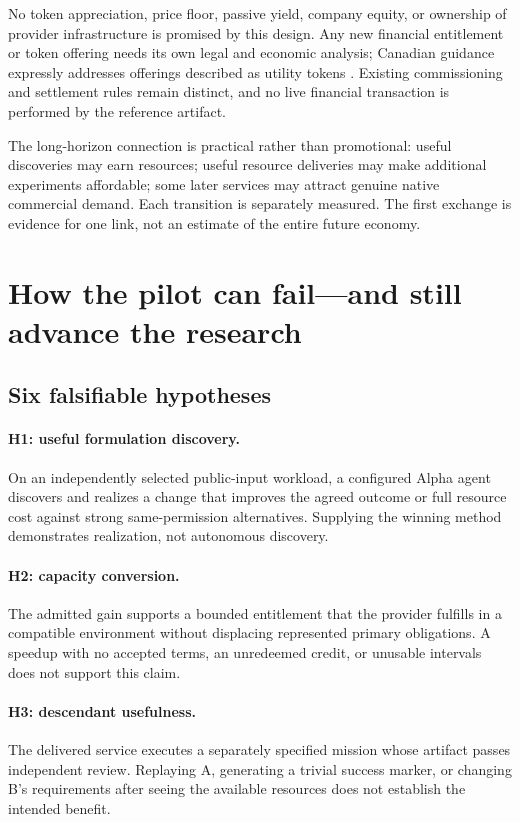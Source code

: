 \documentclass[11pt,letterpaper]{article}
\theoremstyle{remark}\newtheorem{remark}{Remark}[section]
\begin{document}
No token appreciation, price floor, passive yield, company equity, or ownership of provider infrastructure is promised by this design. Any new financial entitlement or token offering needs its own legal and economic analysis; Canadian guidance expressly addresses offerings described as utility tokens \citep{csa}. Existing commissioning and settlement rules remain distinct, and no live financial transaction is performed by the reference artifact.

The long-horizon connection is practical rather than promotional: useful discoveries may earn resources; useful resource deliveries may make additional experiments affordable; some later services may attract genuine native commercial demand. Each transition is separately measured. The first exchange is evidence for one link, not an estimate of the entire future economy.

\section{How the pilot can fail---and still advance the research}
\label{sec:evaluation}
\subsection{Six falsifiable hypotheses}
\paragraph{H1: useful formulation discovery.}
On an independently selected public-input workload, a configured Alpha agent discovers and realizes a change that improves the agreed outcome or full resource cost against strong same-permission alternatives. Supplying the winning method demonstrates realization, not autonomous discovery.

\paragraph{H2: capacity conversion.}
The admitted gain supports a bounded entitlement that the provider fulfills in a compatible environment without displacing represented primary obligations. A speedup with no accepted terms, an unredeemed credit, or unusable intervals does not support this claim.

\paragraph{H3: descendant usefulness.}
The delivered service executes a separately specified mission whose artifact passes independent review. Replaying A, generating a trivial success marker, or changing B's requirements after seeing the available resources does not establish the intended benefit.
\end{document}
